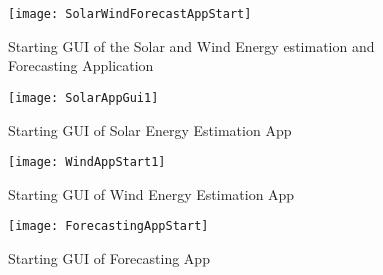 
\begin{figure}[H]
\centering
\texttt{[image: SolarWindForecastAppStart]}
\caption{Starting GUI of the Solar and Wind Energy estimation and Forecasting Application}
\label{figApp7_1} %
\end{figure}


\begin{figure}[H]
\centering
\texttt{[image: SolarAppGui1]}
\caption{Starting GUI of Solar Energy Estimation App}
\label{figApp7_2} %
\end{figure}

\begin{figure}[H]
\centering
\texttt{[image: WindAppStart1]}
\caption{Starting GUI of Wind Energy Estimation App}
\label{figApp7_3} %
\end{figure}


\begin{figure}[H]
\centering
\texttt{[image: ForecastingAppStart]}
\caption{Starting GUI of Forecasting App}
\label{figApp7_4} %
\end{figure}